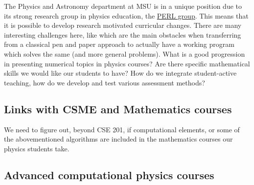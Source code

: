 \documentclass[%
oneside,                 %
final,                   %
10pt]{article}
\begin{document}
The Physics and Astronomy department at MSU is in a unique position due to its strong research group in physics education, the \href{{http://www.pa.msu.edu/research/physics-education-lab}}{PERL group}.
This means that it is possible to
develop research motivated curricular changes.  There are many interesting challenges here, like
which are the main obstacles when transferring from a classical pen and paper approach to actually have a working program which solves the same (and more general problems). What is a good progression in presenting numerical topics in physics courses? Are there specific mathematical skills we would like our students to have? How do we integrate student-active teaching, how do we develop and test various assessment methods?



\subsection*{Links with CSME and Mathematics courses}

We need to figure out, beyond CSE 201, if computational elements, or some of the abovementioned algorithms are included in the mathematics courses our physics students take. 


\subsection*{Advanced computational physics courses}
\end{document}
